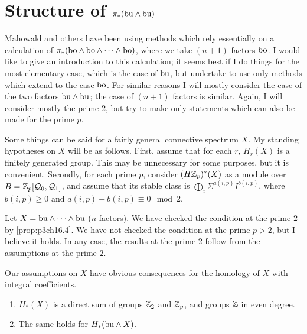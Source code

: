 \documentclass[../main]{subfiles}
\begin{document}
\chapter{Structure of $\pi_*(\mathrm{bu}\wedge \mathrm{bu})$}
\label{sec:p3c17}
Mahowald and others have been using methods which rely essentially on a calculation of $\pi_*(\mathrm{bo}\wedge\mathrm{bo}\wedge\cdots\wedge\mathrm{bo})$, where we take $(n+1)$ factors $\mathrm{bo}$. I would like to give an introduction to this calculation; it seems best if I do things for the most elementary case, which is the case of $\mathrm{bu}$, but undertake to use only methods which extend to the case $\mathrm{bo}$. For similar reasons I will mostly consider the case of the two factors $\mathrm{bu}\wedge\mathrm{bu}$; the case of $(n+1)$ factors is similar. Again, I will consider mostly the prime $2$, but try to make only statements which can also be made for the prime $p$.

Some things can be said for a fairly general connective spectrum $X$.
My standing hypotheses on $X$ will be as follows. First, assume that for each $r$, $H_r(X)$ is a finitely generated group. This may be unnecessary for some purposes, but it is convenient. Secondly, for each prime $p$, consider $(H\mathbb{Z}_p)^*(X)$ as a module over $B = \mathbb{Z}_p[\mathcal{Q}_0,\mathcal{Q}_1]$, and assume that its stable class is $\bigoplus_i\Sigma^{a(i,p)}I^{b(i,p)}$, where $b(i,p) \ge 0$ and $a(i,p) + b(i,p) \equiv 0 \mod 2$.

\begin{examples}
Let $X = \mathrm{bu}\wedge\cdots\wedge\mathrm{bu}$ ($n$ factors). We have checked the condition at the prime $2$ by \ref{prop:p3ch16.4}. We have not checked the condition at the prime $p>2$, but I believe it holds. In any case, the results at the
prime $2$ follow from the assumptions at the prime $2$.
\end{examples}

Our assumptions on $X$ have obvious consequences for the homology
of $X$ with integral coefficients.

\begin{lemma} \label{lem:p3c17.1}
    \begin{enumerate}[label=(\roman*)]
    \item $H_*(X)$ is a direct sum of groups $\mathbb{Z}_2$ and $\mathbb{Z}_p$, and groups $\mathbb{Z}$ in even degree.
    \item The same holds for $H_*(\mathrm{bu}\wedge X)$.
    \end{enumerate}
\end{lemma}
\end{document}
